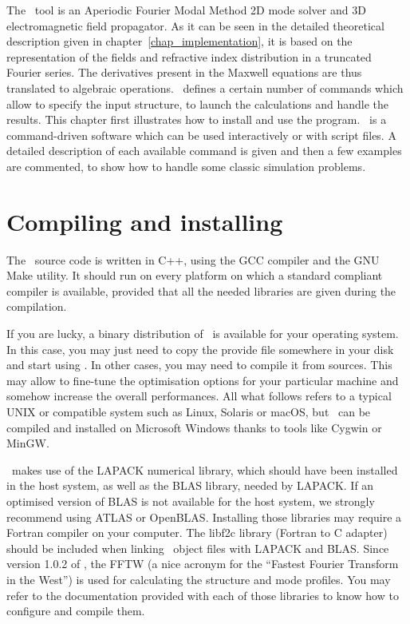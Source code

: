 \textsf{The \afmm\ tool is an Aperiodic Fourier Modal Method 2D mode solver and 3D electromagnetic field propagator. As it can be seen in the detailed theoretical description given in chapter~\ref{chap_implementation}, it is based on the representation of the fields and refractive index distribution in a truncated Fourier series. The derivatives present in the Maxwell equations are thus translated to algebraic operations. \Afmm\ defines a certain number of commands which allow to specify the input structure, to launch the calculations and handle the results. 
This chapter first illustrates how to install and use the program. \Afmm\ is a command-driven software which can be used interactively or with script files. A detailed description of each available command is given and then a few examples are commented, to show how to handle some classic simulation problems.}

\section{Compiling and installing \afmm}

The \afmm\ source code is written in C++,  using the GCC compiler and the GNU Make utility.  It should run on every platform on which a standard compliant compiler is available, provided that all the needed libraries are given during the compilation. 

If you are lucky, a binary distribution of \afmm\ is available for your operating system. In this case, you may just need to copy the provide file somewhere in your disk and start using \afmm . In other cases, you may need to compile it from sources. This may allow to fine-tune the optimisation options for your particular machine and somehow increase the overall performances. All what follows refers to a typical UNIX or compatible system such as Linux, Solaris or macOS, but \afmm\ can be compiled and installed on Microsoft Windows thanks to tools like Cygwin\cite{cygwin_site} or MinGW\cite{mingw_site}.

\Afmm\ makes use of the LAPACK\cite{lapack, lapack_site} numerical library, which should have been installed in the host system, as well as the BLAS\cite{blas, blas_site} library, needed by LAPACK. If an optimised version of BLAS is not available for the host system, we strongly recommend using ATLAS\cite{atlas, atlas_site} or OpenBLAS\cite{openblas_site}. Installing those libraries may require a Fortran compiler on your computer. The libf2c\cite{libf2c_site} library (Fortran to C adapter) should be included when linking \afmm\ object files with LAPACK and BLAS. Since version 1.0.2 of \afmm, the FFTW (a nice acronym for the ``Fastest Fourier Transform in the West''\cite{FFTW05, fftw_site}) is used for calculating the structure and mode profiles. You may refer to the documentation provided with each of those libraries to know how to configure and compile them.

